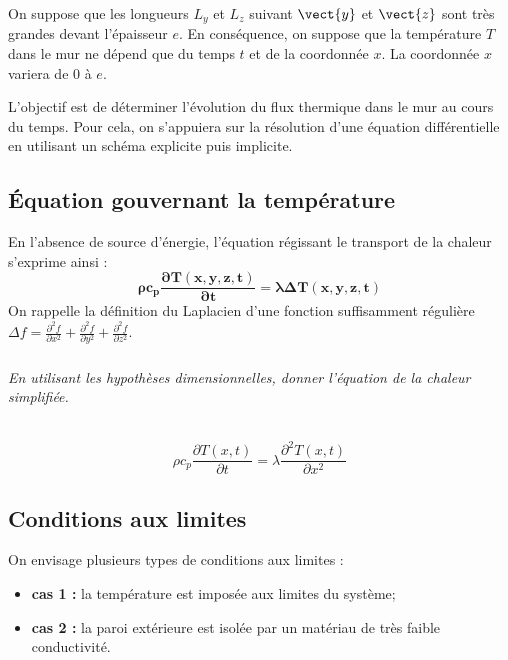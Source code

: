 \noindent
On suppose que les longueurs $L_y$ et $L_z$ suivant $\vect{y}$ et $\vect{z}$ sont très grandes devant l'épaisseur $e$. 
En conséquence, on suppose que la température $T$ dans le mur ne dépend que du temps $t$ et de la coordonnée $x$. La 
coordonnée $x$ variera de 0 à $e$.

\begin{obj}
L'objectif est de déterminer l'évolution du flux thermique dans le mur au cours du temps. Pour cela, on s'appuiera sur 
la résolution d'une équation différentielle en utilisant un schéma explicite puis implicite.
\end{obj}
\fi

\subsection{Équation gouvernant la température}

\ifprof
\else

En l'absence de source d'énergie, l'équation régissant le transport de la chaleur s'exprime ainsi :
\begin{equation}
\mathbf{\rho c_p \dfrac{\partial T(x,y,z,t)}{\partial t} =  \lambda  \Delta T(x,y,z,t)}
\end{equation}
On rappelle la définition du Laplacien d'une fonction suffisamment régulière 
$\Delta f =\frac{\partial^2 f}{\partial x^2}+\frac{\partial^2 f}{\partial y^2}
+\frac{\partial^2 f}{\partial z^2}$.

\subparagraph{}\textit{En utilisant les hypothèses dimensionnelles, donner l'équation de la chaleur simplifiée. }

\fi

\ifprof
\begin{corrige}
\question\
$$ 
\rho c_p \dfrac{\partial T(x,t)}{\partial t} =  \lambda  \dfrac{\partial^2 T(x,t)}{\partial x^2}
$$
\end{corrige}
\else
\fi

\subsection{Conditions aux limites}

\ifprof
\else
On envisage  plusieurs types de conditions aux limites :
\begin{itemize}
\item \textbf{cas 1 : } la température est imposée aux limites du système;
\item \textbf{cas 2 : } la paroi extérieure est isolée par un matériau de très faible conductivité. 
\end{itemize}

